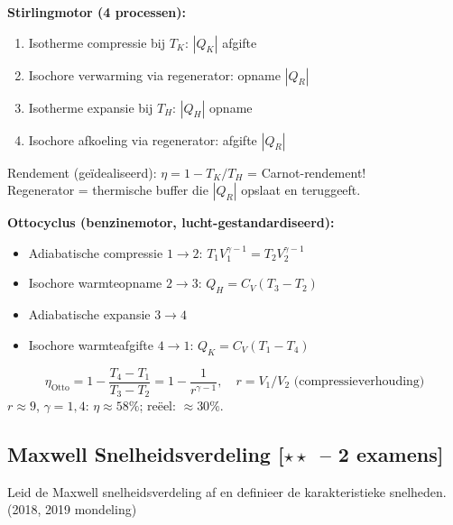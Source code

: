\documentclass[10pt,a4paper]{article}
\begin{document}
\begin{oplossing}
\textbf{Stirlingmotor (4 processen):}
\begin{enumerate}
  \item Isotherme compressie bij $T_K$: $|Q_K|$ afgifte
  \item Isochore verwarming via regenerator: opname $|Q_R|$
  \item Isotherme expansie bij $T_H$: $|Q_H|$ opname
  \item Isochore afkoeling via regenerator: afgifte $|Q_R|$
\end{enumerate}
Rendement (geïdealiseerd): $\eta = 1 - T_K/T_H$ = Carnot-rendement!\\
Regenerator = thermische buffer die $|Q_R|$ opslaat en teruggeeft.

\textbf{Ottocyclus (benzinemotor, lucht-gestandardiseerd):}
\begin{itemize}
  \item Adiabatische compressie $1\to2$: $T_1V_1^{\gamma-1} = T_2V_2^{\gamma-1}$
  \item Isochore warmteopname $2\to3$: $Q_H = C_V(T_3-T_2)$
  \item Adiabatische expansie $3\to4$
  \item Isochore warmteafgifte $4\to1$: $Q_K = C_V(T_1-T_4)$
\end{itemize}
$$\eta_\text{Otto} = 1 - \frac{T_4-T_1}{T_3-T_2} = 1 - \frac{1}{r^{\gamma-1}}, \quad r = V_1/V_2 \text{ (compressieverhouding)}$$
$r \approx 9$, $\gamma=1{,}4$: $\eta \approx 58\%$; reëel: $\approx 30\%$.
\end{oplossing}

\subsection{Maxwell Snelheidsverdeling \textnormal{\color{warningred}[$\star\star$\ -- 2 examens]}}

\begin{theorievraag}{Leid de Maxwell snelheidsverdeling af en definieer de karakteristieke snelheden. \textnormal{(2018, 2019 mondeling)}}
\end{theorievraag}
\end{document}

